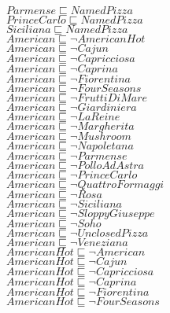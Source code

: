 \documentclass[a4paper,10pt]{article}
\begin{document}
 $Parmense \sqsubseteq NamedPizza$\\ 
 $PrinceCarlo \sqsubseteq NamedPizza$\\ 
 $Siciliana \sqsubseteq NamedPizza$\\ 
 $American \sqsubseteq  \lnot AmericanHot$\\ 
 $American \sqsubseteq  \lnot Cajun$\\ 
 $American \sqsubseteq  \lnot Capricciosa$\\ 
 $American \sqsubseteq  \lnot Caprina$\\ 
 $American \sqsubseteq  \lnot Fiorentina$\\ 
 $American \sqsubseteq  \lnot FourSeasons$\\ 
 $American \sqsubseteq  \lnot FruttiDiMare$\\ 
 $American \sqsubseteq  \lnot Giardiniera$\\ 
 $American \sqsubseteq  \lnot LaReine$\\ 
 $American \sqsubseteq  \lnot Margherita$\\ 
 $American \sqsubseteq  \lnot Mushroom$\\ 
 $American \sqsubseteq  \lnot Napoletana$\\ 
 $American \sqsubseteq  \lnot Parmense$\\ 
 $American \sqsubseteq  \lnot PolloAdAstra$\\ 
 $American \sqsubseteq  \lnot PrinceCarlo$\\ 
 $American \sqsubseteq  \lnot QuattroFormaggi$\\ 
 $American \sqsubseteq  \lnot Rosa$\\ 
 $American \sqsubseteq  \lnot Siciliana$\\ 
 $American \sqsubseteq  \lnot SloppyGiuseppe$\\ 
 $American \sqsubseteq  \lnot Soho$\\ 
 $American \sqsubseteq  \lnot UnclosedPizza$\\ 
 $American \sqsubseteq  \lnot Veneziana$\\ 
 $AmericanHot \sqsubseteq  \lnot American$\\ 
 $AmericanHot \sqsubseteq  \lnot Cajun$\\ 
 $AmericanHot \sqsubseteq  \lnot Capricciosa$\\ 
 $AmericanHot \sqsubseteq  \lnot Caprina$\\ 
 $AmericanHot \sqsubseteq  \lnot Fiorentina$\\ 
 $AmericanHot \sqsubseteq  \lnot FourSeasons$\\ 
\end{document}
